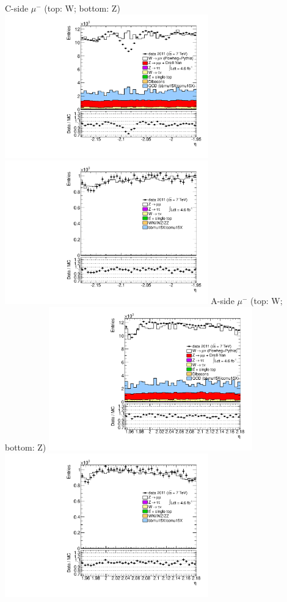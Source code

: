  {
\colb[T]
C-side $\mu^{-}$ (top: W; bottom: Z)
\centering
\includegraphics[width=0.66\textwidth]{dates/20130306/figures/both/Wnometmtid_10_C_stack_l_eta_NEG} \\
\includegraphics[width=0.66\textwidth]{dates/20130306/figures/both/Z_10_C_stack_lN_eta_ALL.pdf}
A-side $\mu^{-}$ (top: W; bottom: Z)
\centering
\includegraphics[width=0.66\textwidth]{dates/20130306/figures/both/Wnometmtid_10_A_stack_l_eta_NEG} \\
\includegraphics[width=0.66\textwidth]{dates/20130306/figures/both/Z_10_A_stack_lN_eta_ALL.pdf} 
\cole
}

